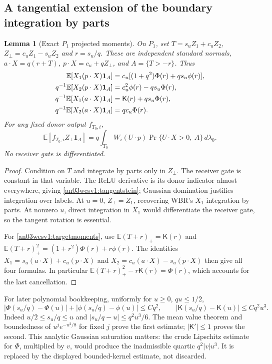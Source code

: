 \documentclass[11pt]{article}
\numberwithin{equation}{section}
\newtheorem{lemma}[theorem]{Lemma}\newtheorem{proposition}[theorem]{Proposition}
\theoremstyle{remark}\newtheorem{remark}[theorem]{Remark}
\newcommand{\E}{\mathbb E}\newcommand{\dd}{\,d}\newcommand{\one}{\mathbf1}
\newcommand{\Kfun}{\mathsf K}\newcommand{\Ffun}{\mathsf F}
\begin{document}
\subsection{A tangential extension of the boundary integration by parts}
\begin{lemma}[Exact $P_1$ projected moments]
\label{an03wcsv1:IBP}
On $P_1$, set $T=s_u Z_1+c_u Z_2$, $Z_\perp=c_u Z_1-s_u Z_2$
and $r=s_u/q$. These are independent standard normals,
$a\cdot X=q(r+T)$, $p\cdot X=c_u+qZ_\perp$, and
$A=\{T>-r\}$. Thus
\begin{align}
 \E[X_1(p\cdot X)\one_A]
 &=c_u[(1+q^2)\Phi(r)+qs_u\phi(r)],\notag\\
 q^{-1}\E[X_2(p\cdot X)\one_A]
 &=c_u^2\phi(r)-qs_u\Phi(r),\notag\\
 q^{-1}\E[X_1(a\cdot X)\one_A]
 &=\Kfun(r)+qs_u\Phi(r),\notag\\
 q^{-1}\E[X_2(a\cdot X)\one_A]&=qc_u\Phi(r).
 \label{an03wcsv1:targetmoments}
\end{align}
For any fixed donor output $f_{T_0,i}$,
\begin{equation}
 \E[f_{T_0,i}Z_\perp\one_A]
 =q\int_{T_0}W_i(U\cdot p)
       \Pr\{U\cdot X>0,\ A\}\,d\lambda_0.
 \label{an03wcsv1:tangentstein}
\end{equation}
No receiver gate is differentiated.
\end{lemma}
\begin{proof}
Condition on $T$ and integrate by parts only in $Z_\perp$.
The receiver gate is constant in that variable. The ReLU derivative
is its donor indicator almost everywhere, giving
\eqref{an03wcsv1:tangentstein}; Gaussian domination justifies
integration over labels. At $u=0$, $Z_\perp=Z_1$, recovering WBR's
$X_1$ integration by parts. At nonzero $u$, direct integration in
$X_1$ would differentiate the receiver gate, so the tangent rotation
is essential.

For \eqref{an03wcsv1:targetmoments}, use
$\E(T+r)_+=\Kfun(r)$ and
$\E(T+r)_+^2=(1+r^2)\Phi(r)+r\phi(r)$.
The identities
$X_1=s_u(a\cdot X)+c_u(p\cdot X)$ and
$X_2=c_u(a\cdot X)-s_u(p\cdot X)$ then give all four formulas.
In particular $\E(T+r)_+^2-r\Kfun(r)=\Phi(r)$, which
accounts for the last cancellation.
\end{proof}

For later polynomial bookkeeping, uniformly for $u\ge0$, $qu\le1/2$,
\begin{equation}
 |\Phi(s_u/q)-\Phi(u)|+|\phi(s_u/q)-\phi(u)|\le Cq^2,
 \qquad |\Kfun(s_u/q)-\Kfun(u)|\le Cq^2u^3.
 \label{an03wcsv1:gaussiansaturation}
\end{equation}
Indeed $u/2\le s_u/q\le u$ and $|s_u/q-u|\le q^2u^3/6$.
The mean value theorem and boundedness of
$u^j e^{-u^2/8}$ for fixed $j$ prove the first estimate;
$|\Kfun'|\le1$ proves the second. This analytic Gaussian
saturation matters: the crude Lipschitz estimate for $\Phi$,
multiplied by $v$, would produce the inadmissible quartic
$q^2|v|u^3$. It is replaced by the displayed bounded-kernel
estimate, not discarded.
\end{document}
